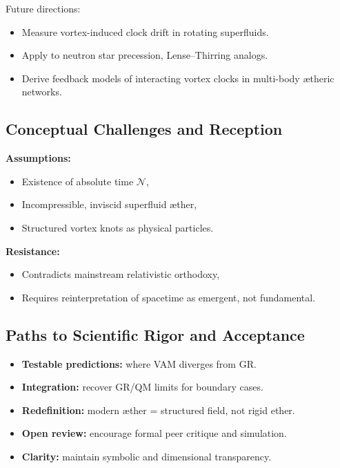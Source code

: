 Future directions:
\begin{itemize}
    \item Measure vortex-induced clock drift in rotating superfluids.
    \item Apply to neutron star precession, Lense–Thirring analogs.
    \item Derive feedback models of interacting vortex clocks in multi-body ætheric networks.
\end{itemize}

\subsection{Conceptual Challenges and Reception}

\textbf{Assumptions:}
\begin{itemize}
    \item Existence of absolute time \( \mathcal{N} \),
    \item Incompressible, inviscid superfluid æther,
    \item Structured vortex knots as physical particles.
\end{itemize}

\textbf{Resistance:}
\begin{itemize}
    \item Contradicts mainstream relativistic orthodoxy,
    \item Requires reinterpretation of spacetime as emergent, not fundamental.
\end{itemize}

\subsection{Paths to Scientific Rigor and Acceptance}

\begin{itemize}
    \item \textbf{Testable predictions:} where VAM diverges from GR.
    \item \textbf{Integration:} recover GR/QM limits for boundary cases.
    \item \textbf{Redefinition:} modern æther = structured field, not rigid ether.
    \item \textbf{Open review:} encourage formal peer critique and simulation.
    \item \textbf{Clarity:} maintain symbolic and dimensional transparency.
\end{itemize}

